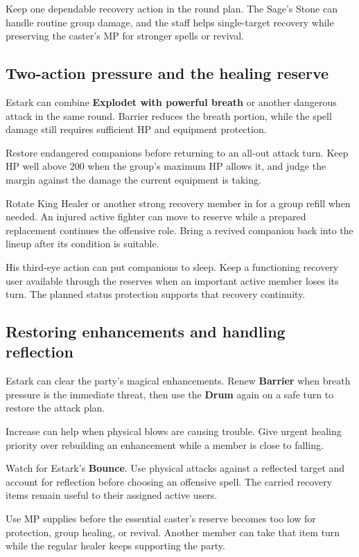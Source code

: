Keep one dependable recovery action in the round plan.
The Sage's Stone can handle routine group damage, and
the staff helps single-target recovery while preserving
the caster's MP for stronger spells or revival.

\subsection*{Two-action pressure and the healing reserve}

Estark can combine \textbf{Explodet with powerful breath}
or another dangerous attack in the same round. Barrier
reduces the breath portion, while the spell damage still
requires sufficient HP and equipment protection.

Restore endangered companions before returning to an
all-out attack turn. Keep HP well above 200 when the
group's maximum HP allows it, and judge the margin
against the damage the current equipment is taking.

Rotate King Healer or another strong recovery member
in for a group refill when needed. An injured active
fighter can move to reserve while a prepared replacement
continues the offensive role. Bring a revived companion
back into the lineup after its condition is suitable.

His third-eye action can put companions to sleep.
Keep a functioning recovery user available through
the reserves when an important active member loses
its turn. The planned status protection supports that
recovery continuity.

\subsection*{Restoring enhancements and handling reflection}

Estark can clear the party's magical enhancements.
Renew \textbf{Barrier} when breath pressure is the
immediate threat, then use the \textbf{Drum} again
on a safe turn to restore the attack plan.

Increase can help when physical blows are causing
trouble. Give urgent healing priority over rebuilding
an enhancement while a member is close to falling.

Watch for Estark's \textbf{Bounce}. Use physical
attacks against a reflected target and account for
reflection before choosing an offensive spell.
The carried recovery items remain useful to their
assigned active users.

Use MP supplies before the essential caster's reserve
becomes too low for protection, group healing, or revival.
Another member can take that item turn while the regular
healer keeps supporting the party.

